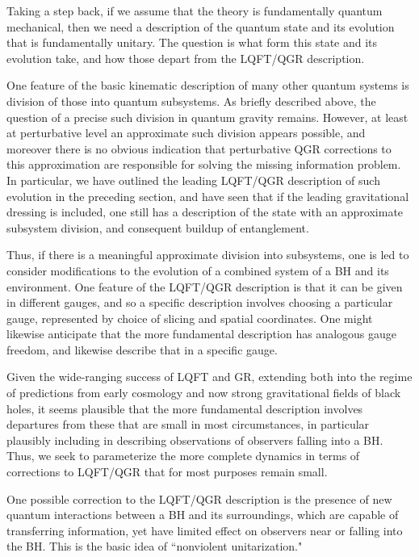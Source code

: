 \documentclass[12pt]{article}
\numberwithin{equation}{section}
\begin{document}
Taking a step back\cite{QFG,QGQF}, if we assume that the theory is fundamentally quantum mechanical, then we need a description of the quantum state and its evolution that is fundamentally unitary.  The question is what form this state and its evolution take, and how those depart from the LQFT/QGR description.  

One feature of the basic kinematic description of many other quantum systems is division of those into quantum subsystems.  As briefly described above, the question of a precise such division in quantum gravity remains.  However, at least at perturbative level an approximate such division appears possible, and moreover there is no obvious indication that perturbative QGR corrections to this approximation are responsible for solving the missing information problem.  In particular, we have outlined the leading LQFT/QGR description of such evolution in the preceding section, and have seen that if the leading gravitational dressing is included, one still has a description of the state with an approximate subsystem division, and consequent buildup of entanglement.
 
Thus, if there is a meaningful approximate division into subsystems, one is led\cite{BHthm} to consider modifications to the evolution of a combined system of a BH and its environment.  One feature of the LQFT/QGR description is that it can be given in different gauges, and so a specific description involves choosing a particular gauge, represented by choice of slicing and spatial coordinates\cite{SE2d}.  One might likewise anticipate that the more fundamental description has analogous gauge freedom, and likewise describe that in a specific gauge.

Given the wide-ranging success of LQFT and GR, extending both into the regime of predictions from early cosmology and now strong gravitational fields of black holes, it seems plausible that the more fundamental description involves departures from these that are small in most circumstances, in particular plausibly including in describing observations of observers falling into a BH.  Thus, we seek to parameterize the more complete dynamics in terms of corrections to LQFT/QGR that for most purposes remain small.

One possible correction to the LQFT/QGR description is the presence of new quantum  interactions between a BH and its surroundings, which are capable of transferring information, yet have limited effect on observers near or falling into the BH.  This is the basic idea of ``nonviolent unitarization."  
\end{document}
